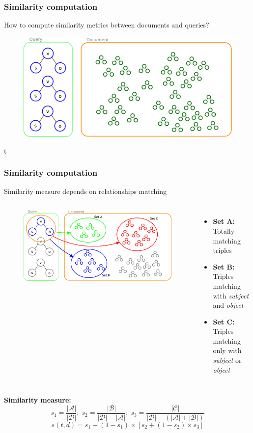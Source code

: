 \documentclass{beamer}
\begin{document}
\begin{frame}
\frametitle{Similarity computation}
How to compute similarity metrics between documents and queries?
\begin{figure}
\includegraphics[scale=0.35]{imgs/docsim}
\end{figure}
\end{frame}


\begin{frame}{t}
\frametitle{Similarity computation}
Similarity measure depends on relationships matching
\bigskip
\begin{columns}[T]
\begin{figure}
\includegraphics[scale=0.2]{imgs/sets}
\end{figure}
\begin{itemize}
\item {\bfseries{Set A:\\}} Totally matching triples
\item {\bfseries{Set B:\\}} Triples matching with \emph{subject} and \emph{object}
\item {\bfseries{Set C:\\}} Triples matching only with \emph{subject} or \emph{object}
\end{itemize}
\end{columns}
\bigskip
\vspace{1mm}
{\color{red}\bfseries{Similarity measure:}}
\tiny
$$
s_{1} = \frac{|\mathcal{A}|}{|\mathcal{D}|};\;
s_{2} = \frac{|\mathcal{B}|}{|\mathcal{D}| - |\mathcal{A}|};\;
s_{3} = \frac{|\mathcal{C}|}{|\mathcal{D}|-(|\mathcal{A}|+|\mathcal{B}|)}
$$
\small
$$
s (t, d) = s_{1} + (1 - s_{1}) \times
[s_{2} + (1 - s_{2}) \times s_{3}]
$$
\bigskip
\end{frame}
\end{document}
